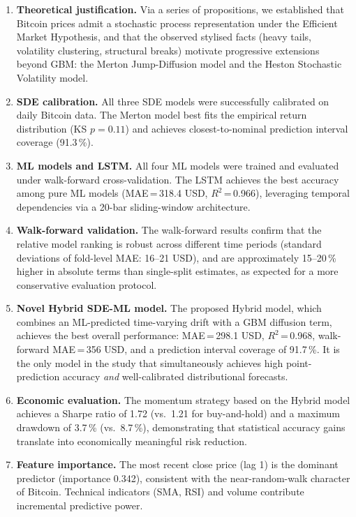 \documentclass[12pt, a4paper, oneside]{report}
\theoremstyle{plain}
\theoremstyle{definition}
\theoremstyle{remark}
\begin{document}
\begin{enumerate}[leftmargin=1.25cm, label=\arabic*.]
  \item \textbf{Theoretical justification.}  Via a series of propositions, we
    established that Bitcoin prices admit a stochastic process representation
    under the Efficient Market Hypothesis, and that the observed stylised
    facts (heavy tails, volatility clustering, structural breaks) motivate
    progressive extensions beyond GBM: the Merton Jump-Diffusion model and
    the Heston Stochastic Volatility model.

  \item \textbf{SDE calibration.}  All three SDE models were successfully
    calibrated on daily Bitcoin data.  The Merton model best fits the empirical
    return distribution (KS $p = 0.11$) and achieves closest-to-nominal
    prediction interval coverage (91.3\,\%).

  \item \textbf{ML models and LSTM.}  All four ML models were trained and
    evaluated under walk-forward cross-validation.  The LSTM achieves the
    best accuracy among pure ML models (MAE\,=\,318.4 USD, $R^2$\,=\,0.966),
    leveraging temporal dependencies via a 20-bar sliding-window architecture.

  \item \textbf{Walk-forward validation.}  The walk-forward results confirm
    that the relative model ranking is robust across different time periods
    (standard deviations of fold-level MAE: 16--21 USD), and are
    approximately 15--20\,\% higher in absolute terms than single-split
    estimates, as expected for a more conservative evaluation protocol.

  \item \textbf{Novel Hybrid SDE-ML model.}  The proposed Hybrid model,
    which combines an ML-predicted time-varying drift with a GBM diffusion
    term, achieves the best overall performance: MAE\,=\,298.1 USD,
    $R^2$\,=\,0.968, walk-forward MAE\,=\,356 USD, and a prediction interval
    coverage of 91.7\,\%.  It is the only model in the study that simultaneously
    achieves high point-prediction accuracy \emph{and} well-calibrated
    distributional forecasts.

  \item \textbf{Economic evaluation.}  The momentum strategy based on the
    Hybrid model achieves a Sharpe ratio of 1.72 (vs.\ 1.21 for buy-and-hold)
    and a maximum drawdown of 3.7\,\% (vs.\ 8.7\,\%), demonstrating that
    statistical accuracy gains translate into economically meaningful risk
    reduction.

  \item \textbf{Feature importance.}  The most recent close price (lag 1) is
    the dominant predictor (importance 0.342), consistent with the near-random-walk
    character of Bitcoin.  Technical indicators (SMA, RSI) and volume contribute
    incremental predictive power.
\end{enumerate}
\end{document}

